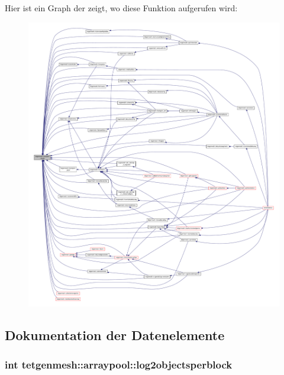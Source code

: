 Hier ist ein Graph der zeigt, wo diese Funktion aufgerufen wird\-:
\nopagebreak
\begin{figure}[H]
\begin{center}
\leavevmode
\includegraphics[width=350pt]{classtetgenmesh_1_1arraypool_a19030126ef81a9ff3c4aca35f0347cdc_icgraph}
\end{center}
\end{figure}




\subsection{Dokumentation der Datenelemente}
\hypertarget{classtetgenmesh_1_1arraypool_ab61ada3b2fc49879a160a919e9994279}{
\subsubsection[{log2objectsperblock}]{\setlength{\rightskip}{0pt plus 5cm}int tetgenmesh\-::arraypool\-::log2objectsperblock}}\label{classtetgenmesh_1_1arraypool_ab61ada3b2fc49879a160a919e9994279}


